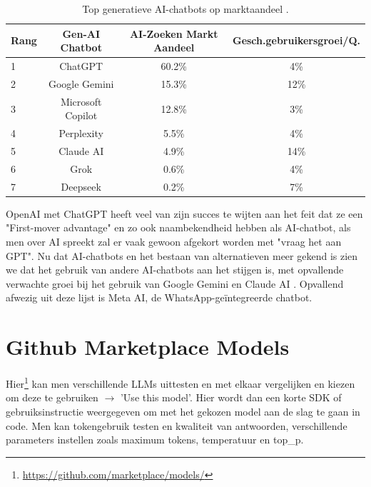 \begin{table}[H]
    \centering
    \begin{tabular}{lccc}
        \toprule
        \textbf{Rang} & \textbf{Gen-AI Chatbot} & \textbf{AI-Zoeken Markt Aandeel} & \textbf{Gesch.gebruikersgroei/Q.} \\
        \midrule
        1 & ChatGPT & 60.2\% & 4\% \\
        2 & Google Gemini & 15.3\% & 12\% \\
        3 & Microsoft Copilot & 12.8\% & 3\% \\
        4 & Perplexity & 5.5\% & 4\% \\
        5 & Claude AI & 4.9\% & 14\% \\
        6 & Grok & 0.6\% & 4\% \\
        7 & Deepseek & 0.2\% & 7\% \\
        \bottomrule
    \end{tabular}
    \caption[Populaire Ollama modellen]{\label{tab:generatieveaichatbots}Top generatieve AI-chatbots op marktaandeel \autocite{Bailyn2026}.}
\end{table}

OpenAI met ChatGPT heeft veel van zijn succes te wijten aan het feit dat ze een "First-mover advantage" en zo ook naambekendheid hebben als AI-chatbot, als men over AI spreekt zal er vaak gewoon afgekort worden met "vraag het aan GPT". Nu dat AI-chatbots en het bestaan van alternatieven meer gekend is zien we dat het gebruik van andere AI-chatbots aan het stijgen is, met opvallende verwachte groei bij het gebruik van Google Gemini en Claude AI \autocite{Bailyn2026}. Opvallend afwezig uit deze lijst is Meta AI, de WhatsApp-geïntegreerde chatbot.

\section{Github Marketplace Models}
\label{sec:githubmarketplacemodels}

Hier\footnote{\href{https://github.com/marketplace/models/}{https://github.com/marketplace/models/}} kan men verschillende LLMs uittesten en met elkaar vergelijken en kiezen om deze te gebruiken $\rightarrow$ 'Use this model'. Hier wordt dan een korte SDK of gebruiksinstructie weergegeven om met het gekozen model aan de slag te gaan in code. Men kan tokengebruik testen en kwaliteit van antwoorden, verschillende parameters instellen zoals maximum tokens, temperatuur en top\_p.

